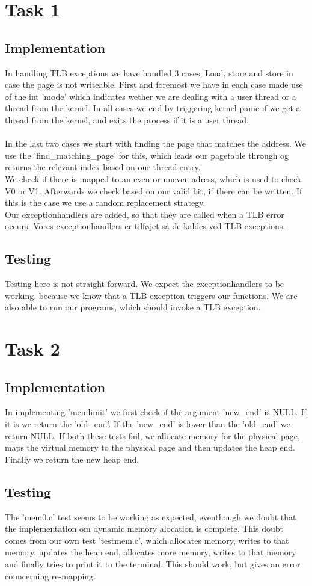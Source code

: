 \documentclass[12pt]{article}
\begin{document}
\section*{Task 1}
\subsection*{Implementation}
In handling TLB exceptions we have handled 3 cases; Load, store and store in case the page is not writeable. First and foremost we have in each case made use of the int 'mode' which indicates wether we are dealing with a user thread or a thread from the kernel. In all cases we end by triggering kernel panic if we get a thread from the kernel, and exits the process if it is a user thread.\\\\
In the last two cases we start with finding the page that matches the address. We use the 'find\_matching\_page' for this, which leads our pagetable through og returns the relevant index based on our thread entry.\\
We check if there is mapped to an even or uneven adress, which is used to check V0 or V1. Afterwards we check based on our valid bit, if there can be written. If this is the case we use a random replacement strategy.\\
Our exceptionhandlers are added, so that they are called when a TLB error occurs.
Vores exceptionhandlers er tilføjet så de kaldes ved TLB exceptions.

\subsection*{Testing}
Testing here is not straight forward. We expect the exceptionhandlers to be working, because we know that a TLB exception triggers our functions. We are also able to run our programs, which should invoke a TLB exception.

\section*{Task 2}
\subsection*{Implementation}
In implementing 'memlimit' we first check if the argument 'new\_end' is NULL. If it is we return the 'old\_end'. If the 'new\_end' is lower than the 'old\_end' we return NULL. If both these tests fail, we allocate memory for the physical page, maps the virtual memory to the physical page and then updates the heap end. Finally we return the new heap end.
\subsection*{Testing}
The 'mem0.c' test seems to be working as expected, eventhough we doubt that the implementation om dynamic memory alocation is complete. This doubt comes from our own test 'testmem.c', which allocates memory, writes to that memory, updates the heap end, allocates more memory, writes to that memory and finally tries to print it to the terminal. This should work, but gives an error councerning re-mapping.
\end{document}
